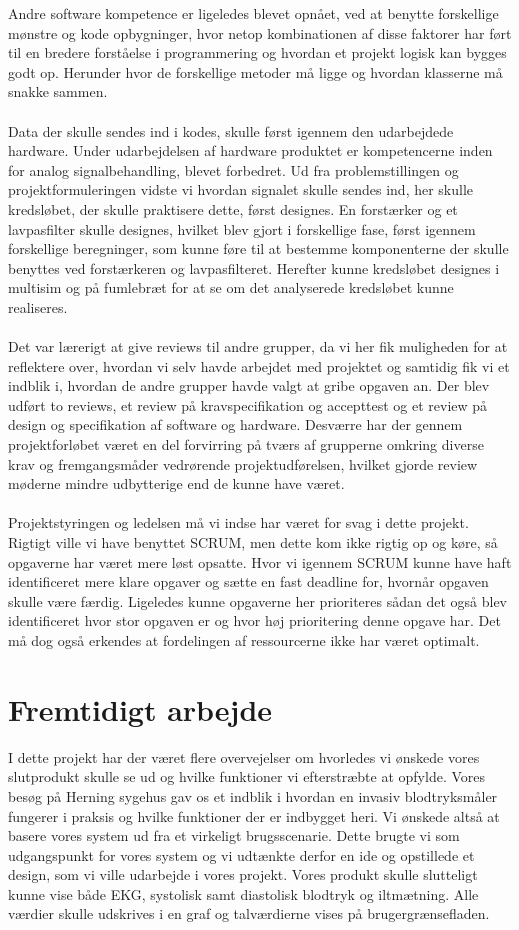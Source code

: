 Andre software kompetence er ligeledes blevet opnået, ved at benytte forskellige mønstre og kode opbygninger, hvor netop kombinationen af disse faktorer har ført til en bredere forståelse i programmering og hvordan et projekt logisk kan bygges godt op. Herunder hvor de forskellige metoder må ligge og hvordan klasserne må snakke sammen. \\\\
Data der skulle sendes ind i kodes, skulle først igennem den udarbejdede hardware. Under udarbejdelsen af hardware produktet er kompetencerne inden for analog signalbehandling, blevet forbedret. Ud fra problemstillingen og projektformuleringen vidste vi hvordan signalet skulle sendes ind, her skulle kredsløbet, der skulle praktisere dette, først designes. En forstærker og et lavpasfilter skulle designes, hvilket blev gjort i forskellige fase, først igennem forskellige beregninger, som kunne føre til at bestemme komponenterne der skulle benyttes ved forstærkeren og lavpasfilteret. Herefter kunne kredsløbet designes i multisim og på fumlebræt for at se om det analyserede kredsløbet kunne realiseres. \\\\
Det var lærerigt at give reviews til andre grupper, da vi her fik muligheden for at reflektere over, hvordan vi selv havde arbejdet med projektet og samtidig fik vi et indblik i, hvordan de andre grupper havde valgt at gribe opgaven an. Der blev udført to reviews, et review på kravspecifikation og accepttest og et review på design og specifikation af software og hardware.  Desværre har der gennem projektforløbet været en del forvirring på tværs af grupperne omkring diverse krav og fremgangsmåder vedrørende projektudførelsen, hvilket gjorde review møderne mindre udbytterige end de kunne have været.\\\\
Projektstyringen og ledelsen må vi indse har været for svag i dette projekt. Rigtigt ville vi have benyttet SCRUM, men dette kom ikke rigtig op og køre, så opgaverne har været mere løst opsatte. Hvor vi igennem SCRUM kunne have haft identificeret mere klare opgaver og sætte en fast deadline for, hvornår opgaven skulle være færdig. Ligeledes kunne opgaverne her prioriteres sådan det også blev identificeret hvor stor opgaven er og hvor høj prioritering denne opgave har. Det må dog også erkendes at fordelingen af ressourcerne ikke har været optimalt. 
\section{Fremtidigt arbejde}
I dette projekt har der været flere overvejelser om hvorledes vi ønskede vores slutprodukt skulle se ud og hvilke funktioner vi efterstræbte at opfylde. Vores besøg på Herning sygehus gav os et indblik i hvordan en invasiv blodtryksmåler fungerer i praksis og hvilke funktioner der er indbygget heri. Vi ønskede altså at basere vores system ud fra et virkeligt brugsscenarie. Dette brugte vi som udgangspunkt for vores system og vi udtænkte derfor en ide og opstillede et design, som vi ville udarbejde i vores projekt. Vores produkt skulle slutteligt kunne vise både EKG, systolisk samt diastolisk blodtryk og iltmætning. Alle værdier skulle udskrives i en graf og talværdierne vises på brugergrænsefladen. 
